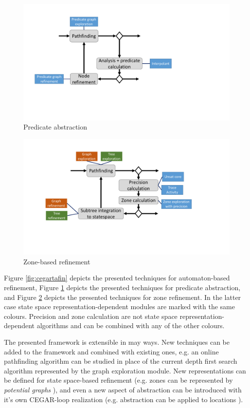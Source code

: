 \begin{figure}
	\centering
	\includegraphics[width=.9\textwidth]{include/figures/cegar_modules}
	\caption{Predicate abstraction}
	\label{fig:cegarpredmodules}
\end{figure}

\begin{figure}
	\centering
	\includegraphics[width=.9\textwidth]{include/figures/cegar_ssp_complete}
	\caption{Zone-based refinement}
	\label{fig:cegarsspfin}
\end{figure}

Figure \ref{fig:cegartafin} depicts the presented techniques for automaton-based refinement, Figure \ref{fig:cegarpredmodules} depicts the presented techniques for predicate abstraction, and Figure \ref{fig:cegarsspfin} depicts the presented techniques for zone refinement. In the latter case state space representation-dependent modules are marked with the same colours. Precision and zone calculation are not state space representation-dependent algorithms and can be combined with any of the other colours.

The presented framework is extensible in may ways. New techniques can be added to the framework and combined with existing ones, e.g. an online pathfinding algorithm can be studied in place of the current depth first search algorithm represented by the graph exploration module. New representations can be defined for state space-based refinement (e.g. zones can be represented by \emph{potential graphs} \cite{conf/sas/GangeNSSS16}), and even a new aspect of abstraction can be introduced with it's own CEGAR-loop realization (e.g. abstraction can be applied to locations \cite{kemper2007sat}).

